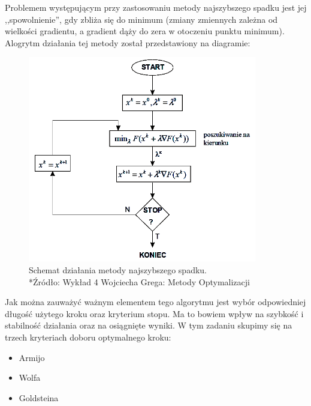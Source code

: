 \documentclass{classrep}
\begin{document}
Problemem występującym przy zastosowaniu metody najszybszego spadku jest jej ,,spowolnienie'', gdy zbliża się do minimum (zmiany zmiennych zależna od wielkości gradientu, a gradient dąży do zera w otoczeniu punktu minimum). Alogrytm działania tej metody został przedstawiony na diagramie:
\begin{figure}[h!]
\centering
\includegraphics[width=10cm]{obrazy/metodaNS_algo} 
\caption{Schemat działania metody najszybszego spadku.\\*{\footnotesize Źródło: Wykład 4 Wojciecha Grega: Metody Optymalizacji}}
\label{fig:metodaNS_algo}
\end{figure}

Jak można zauważyć ważnym elementem tego algorytmu jest wybór odpowiedniej długość użytego kroku oraz kryterium stopu. Ma to bowiem wpływ na szybkość i stabilność działania oraz na osiągnięte wyniki. W tym zadaniu skupimy się na trzech kryteriach doboru optymalnego kroku:
\begin{itemize}
\item Armijo
\item Wolfa
\item Goldsteina
\end{itemize}
\end{document}

